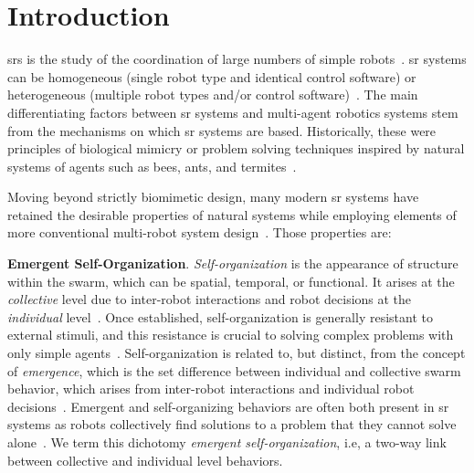 \chapter{Introduction}\label{chap:intro}


\glspl{sr} is the study of the coordination of large numbers of simple
robots~\cite{Sahin2005}. \gls{sr} systems can be homogeneous (single robot type
and identical control software) or heterogeneous (multiple robot types and/or
control software)~\cite{Dorigo2013,Rizk2019,Ramachandran2020}. The main
differentiating factors between \gls{sr} systems and multi-agent robotics
systems stem from the mechanisms on which \gls{sr} systems are based.
Historically, these were principles of biological mimicry or problem solving
techniques inspired by natural systems of agents such as bees, ants, and
termites~\cite{Labella}.

Moving beyond strictly biomimetic design, many modern \gls{sr} systems have
retained the desirable properties of natural systems while employing elements of
more conventional multi-robot system
design~\cite{Castello2016,Arvin2015,Steyven2018}. Those properties are:

\textbf{Emergent Self-Organization}. \emph{Self-organization} is the appearance
of structure within the swarm, which can be spatial, temporal, or functional. It
arises at the \emph{collective} level due to inter-robot interactions and robot
decisions at the \emph{individual} level~\cite{Winfield2005a,Galstyan2005}. Once
established, self-organization is generally resistant to external stimuli, and
this resistance is crucial to solving complex problems with only simple
agents~\cite{Hunt2020,DeWolf2005}.  Self-organization is related to, but
distinct, from the concept of \emph{emergence}, which is the set difference
between individual and collective swarm behavior, which arises from inter-robot
interactions and individual robot decisions~\cite{Szabo2014,DeWolf2005}.
Emergent and self-organizing behaviors are often both present in \gls{sr} systems as
robots collectively find solutions to a problem that they cannot solve
alone~\cite{Cotsaftis2009,Hunt2020}. We term this dichotomy \emph{emergent
  self-organization}, i.e, a two-way link between collective and individual level
behaviors.

